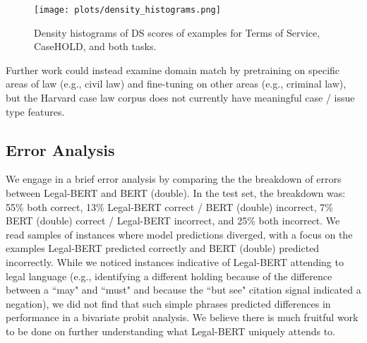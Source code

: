 \documentclass[sigconf]{acmart}
\begin{document}
\begin{figure}
    \centering
    \texttt{[image: plots/density\_histograms.png]}
    \vspace{-0.15in}
    \caption{Density histograms of DS scores of examples for Terms of Service, CaseHOLD, and both tasks.}
    \label{fig:domainmatch}
    \vspace{-0.15in}
\end{figure}

Further work could instead examine domain match by pretraining on specific areas of law (e.g., civil law) and fine-tuning on other areas (e.g., criminal law), but the Harvard case law corpus does not currently have meaningful case / issue type features.

\subsection{Error Analysis}
We engage in a brief error analysis by comparing the the breakdown of errors between Legal-BERT and BERT (double). In the test set, the breakdown was: 55\% both correct, 13\% Legal-BERT correct / BERT (double) incorrect, 7\% BERT (double) correct / Legal-BERT incorrect, and 25\% both incorrect. We read  samples of instances where model predictions diverged, with a focus on the examples Legal-BERT predicted correctly and BERT (double) predicted incorrectly. While we noticed instances indicative of Legal-BERT attending to legal language (e.g., identifying a different holding because of the difference between a ``may" and ``must" and because the ``but see" citation signal indicated a negation), we did not find that such simple phrases predicted differences in performance in a bivariate probit analysis.  We believe there is much fruitful work to  be done on further understanding what Legal-BERT uniquely attends to.
\end{document}
